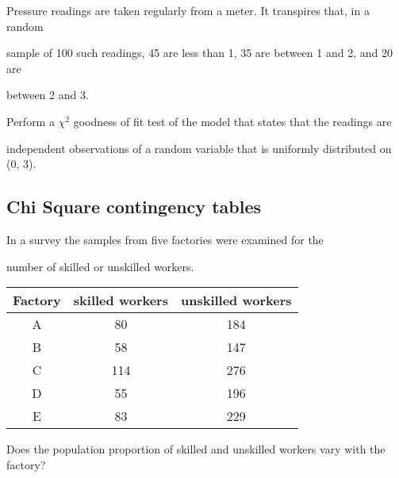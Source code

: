  



Pressure readings are taken regularly from a meter. It transpires that, in a random

sample of 100 such readings, 45 are less than 1, 35 are between 1 and 2, and 20 are

between 2 and 3.

 

Perform a $\chi^2$ goodness of fit test of the model that states that the readings are

independent observations of a random variable that is uniformly distributed on (0, 3).

 



\subsection{Chi Square contingency tables}

 



In a survey the samples from five factories were examined for the

number of skilled or unskilled workers.

 



\begin{tabular}{|c|c|c|}

  \hline


  Factory & skilled workers & unskilled workers \\ \hline

  A & 80 & 184 \\

  B & 58 & 147 \\

  C & 114 & 276 \\

  D & 55 & 196 \\

  E & 83 & 229 \\

  \hline

\end{tabular}

 

Does the population proportion of skilled and unskilled workers vary with the factory?

